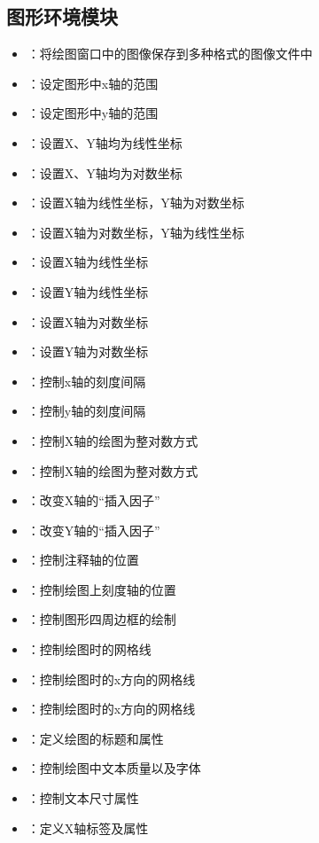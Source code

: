 \subsection*{图形环境模块}
\begin{itemize}
\item {}：将绘图窗口中的图像保存到多种格式的图像文件中
\item {}：设定图形中x轴的范围
\item {}：设定图形中y轴的范围
\item {}：设置X、Y轴均为线性坐标
\item {}：设置X、Y轴均为对数坐标
\item {}：设置X轴为线性坐标，Y轴为对数坐标
\item {}：设置X轴为对数坐标，Y轴为线性坐标
\item {}：设置X轴为线性坐标
\item {}：设置Y轴为线性坐标
\item {}：设置X轴为对数坐标
\item {}：设置Y轴为对数坐标
\item {}：控制x轴的刻度间隔
\item {}：控制y轴的刻度间隔
\item {}：控制X轴的绘图为整对数方式
\item {}：控制X轴的绘图为整对数方式
\item {}：改变X轴的``插入因子''
\item {}：改变Y轴的``插入因子''
\item {}：控制注释轴的位置
\item {}：控制绘图上刻度轴的位置
\item {}：控制图形四周边框的绘制
\item {}：控制绘图时的网格线
\item {}：控制绘图时的x方向的网格线
\item {}：控制绘图时的x方向的网格线
\item {}：定义绘图的标题和属性
\item {}：控制绘图中文本质量以及字体
\item {}：控制文本尺寸属性
\item {}：定义X轴标签及属性

\end{itemize}
